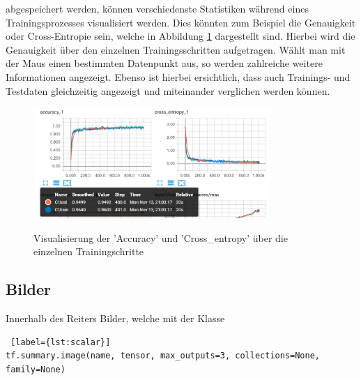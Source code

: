 \vspace{0.2cm}

abgespeichert werden, können verschiedenste Statistiken während eines Trainingsprozesses visualisiert werden. Dies könnten zum Beispiel die Genauigkeit oder Cross-Entropie sein, welche in Abbildung \ref{fig:skalare} dargestellt sind. Hierbei wird die Genauigkeit über den einzelnen Trainingsschritten aufgetragen. Wählt man mit der Maus einen bestimmten Datenpunkt aus, so werden zahlreiche weitere Informationen angezeigt. Ebenso ist hierbei ersichtlich, dass auch Trainings- und Testdaten gleichzeitig angezeigt und miteinander verglichen werden können.

\begin{figure}[h!]
	\centering
	 \includegraphics[width=0.8\textwidth]{images/Kapitel_3/skalars.png}\\
	\vspace{10pt} 
	\caption[Visualisierung der 'Accuracy' und 'Cross\_entropy' über die einzelnen Trainingsschritte]{Visualisierung der 'Accuracy' und 'Cross\_entropy' über die einzelnen Trainingschritte}
	\label{fig:skalare}
\end{figure}





\subsection{Bilder}

Innerhalb des Reiters Bilder, welche mit der Klasse
\\

\begin{minipage}{\linewidth}
\begin{lstlisting} [label={lst:scalar}]
tf.summary.image(name, tensor, max_outputs=3, collections=None, family=None)
\end{lstlisting}
\end{minipage}


